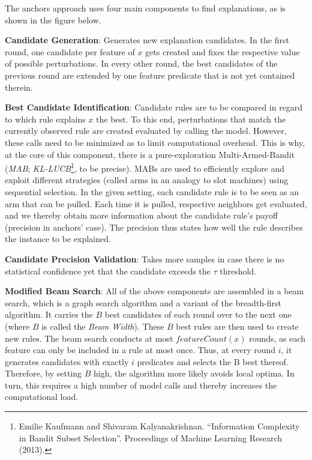 \documentclass[12pt,]{krantz}
\begin{document}
The anchors approach uses four main components to find explanations, as
is shown in the figure below.

\textbf{Candidate Generation}: Generates new explanation candidates. In
the first round, one candidate per feature of \(x\) gets created and
fixes the respective value of possible perturbations. In every other
round, the best candidates of the previous round are extended by one
feature predicate that is not yet contained therein.

\textbf{Best Candidate Identification}: Candidate rules are to be
compared in regard to which rule explains \(x\) the best. To this end,
perturbations that match the currently observed rule are created
evaluated by calling the model. However, these calls need to be
minimized as to limit computational overhead. This is why, at the core
of this component, there is a pure-exploration Multi-Armed-Bandit
(\emph{MAB}; \emph{KL-LUCB}\footnote{Emilie Kaufmann and Shivaram
  Kalyanakrishnan. ``Information Complexity in Bandit Subset
  Selection''. Proceedings of Machine Learning Research (2013).}, to be
precise). MABs are used to efficiently explore and exploit different
strategies (called arms in an analogy to slot machines) using sequential
selection. In the given setting, each candidate rule is to be seen as an
arm that can be pulled. Each time it is pulled, respective neighbors get
evaluated, and we thereby obtain more information about the candidate
rule's payoff (precision in anchors' case). The precision thus states
how well the rule describes the instance to be explained.

\textbf{Candidate Precision Validation}: Takes more samples in case
there is no statistical confidence yet that the candidate exceeds the
\(\tau\) threshold.

\textbf{Modified Beam Search}: All of the above components are assembled
in a beam search, which is a graph search algorithm and a variant of the
breadth-first algorithm. It carries the \(B\) best candidates of each
round over to the next one (where \(B\) is called the \emph{Beam
Width}). These \(B\) best rules are then used to create new rules. The
beam search conducts at most \(featureCount(x)\) rounds, as each feature
can only be included in a rule at most once. Thus, at every round \(i\),
it generates candidates with exactly \(i\) predicates and selects the B
best thereof. Therefore, by setting \(B\) high, the algorithm more
likely avoids local optima. In turn, this requires a high number of
model calls and thereby increases the computational load.
\end{document}
